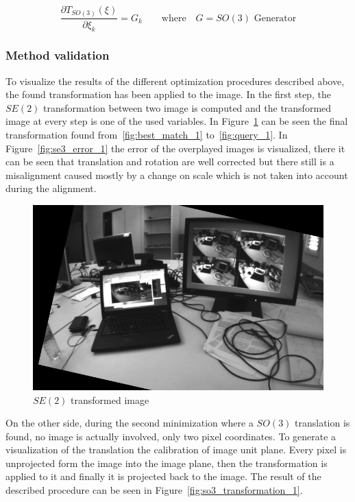 \begin{equation}
  \frac{\partial T_{SO(3)}(\xi)}{\partial \xi_k}  = G_k \qquad \text{where} \quad G = \text{$SO(3)$ Generator}
\end{equation}


\subsubsection{Method validation}
\label{ssub:esm_method_validation}

To visualize the results of the different optimization procedures described above, the found transformation has been applied to the image. In the first step, the $SE(2)$ transformation between two image is computed and the transformed image at every step is one of the used variables. In Figure~\ref{fig:se2_transformation_1} can be seen the final transformation found from~\ref{fig:best_match_1} to~\ref{fig:query_1}. In Figure~\ref{fig:se3_error_1} the error of the overplayed images is visualized, there it can be seen that translation and rotation are well corrected but there still is a misalignment caused mostly by a change on scale which is not taken into account during the alignment.\\

\begin{figure}[htpb]
  \centering
  \includegraphics[width=0.6\linewidth]{img/se2_transformation_1.png}
  \caption{$SE(2)$ transformed image}
  \label{fig:se2_transformation_1}
\end{figure}

On the other side, during the second minimization where a $SO(3)$ translation is found, no image is actually involved, only two pixel coordinates. To generate a visualization of the translation the calibration of image unit plane. Every pixel is unprojected form the image into the image plane, then the transformation is applied to it and finally it is projected back to the image. The result of the described procedure can be seen in Figure~\ref{fig:so3_transformation_1}.\\

